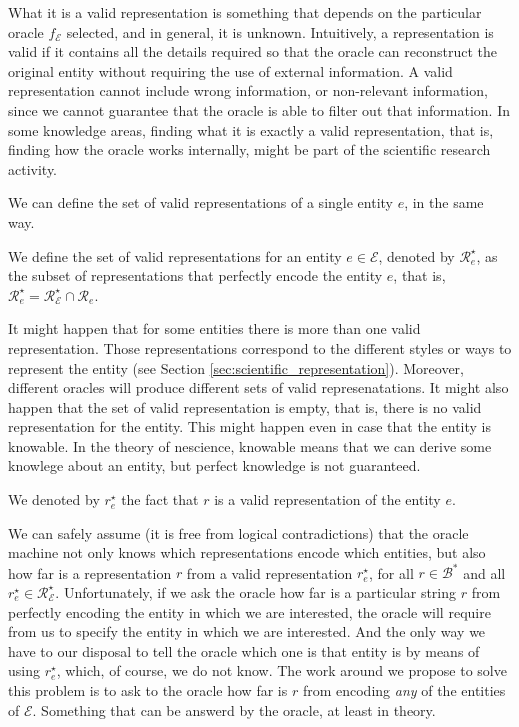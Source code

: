 What it is a valid representation is something that depends on the particular oracle $f_\mathcal{E}$ selected, and in general, it is unknown. Intuitively, a representation is valid if it contains all the details required so that the oracle can reconstruct the original entity without requiring the use of external information. A valid representation cannot include wrong information, or non-relevant information, since we cannot guarantee that the oracle is able to filter out that information. In some knowledge areas, finding what it is exactly a valid representation, that is, finding how the oracle works internally, might be part of the scientific research activity.

We can define the set of valid representations of a single entity $e$, in the same way.

\begin{definition}
We define the set of valid representations for an entity $e \in \mathcal{E}$, denoted by $\mathcal{R}^\star_e$, as the subset of representations that perfectly encode the entity $e$, that is, $\mathcal{R}^\star_e = \mathcal{R}^\star_\mathcal{E} \cap \mathcal{R}_e$.
\end{definition}

It might happen that for some entities there is more than one valid representation. Those representations correspond to the different styles or ways to represent the entity (see Section \ref{sec:scientific_representation}). Moreover, different oracles will produce different sets of valid represenatations. It might also happen that the set of valid representation is empty, that is, there is no valid representation for the entity. This might happen even in case that the entity is knowable. In the theory of nescience, knowable means that we can derive some knowlege about an entity, but perfect knowledge is not guaranteed.

\begin{notation}
We denoted by $r^\star_e$ the fact that $r$ is a valid representation of the entity $e$.
\end{notation}

We can safely assume (it is free from logical contradictions) that the oracle machine not only knows which representations encode which entities, but also how far is a representation $r$ from a valid representation $r^\star_e$, for all $r \in \mathcal{B}^\ast$ and all $r^\star_e \in \mathcal{R}^\star_\mathcal{E}$. Unfortunately, if we ask the oracle how far is a particular string $r$ from perfectly encoding the entity in which we are interested, the oracle will require from us to specify the entity in which we are interested. And the only way we have to our disposal to tell the oracle which one is that entity is by means of using $r^\star_e$, which, of course, we do not know. The work around we propose to solve this problem is to ask to the oracle how far is $r$ from encoding \emph{any} of the entities of $\mathcal{E}$. Something that can be answerd by the oracle, at least in theory.

